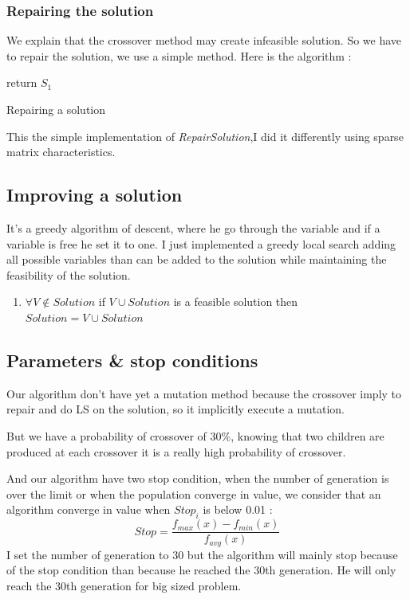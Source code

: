 \documentclass[12pt]{article}
\begin{document}
	\subsubsection{Repairing the solution}
	We explain that the crossover method may create infeasible solution. So we have to repair the solution, we use a simple method.
	Here is the algorithm :
	
	 \begin{algorithm}
	 	return	$S_1$
	 	\caption{Repairing a solution}
	 \end{algorithm}
 	This the simple implementation of \textit{RepairSolution},I did it differently using sparse matrix characteristics.
 	\subsection{Improving a solution}
 	It's a greedy algorithm of descent, where he go through the variable and if a variable  is free he set it to one.
 	I just implemented a greedy local search adding all possible variables than can be added to the solution while maintaining the feasibility of the solution.
 	\begin{enumerate}\item $\forall V \notin Solution$
 		\subitem if $ V  \cup Solution $ is a feasible solution
 		\subsubitem then $ Solution = V \cup Solution$ 
 	\end{enumerate}
 	\subsection{Parameters \& stop conditions}
 	Our algorithm don't have yet a mutation method because the crossover imply to repair and do LS on the solution, so it implicitly execute a mutation. 
 	
 	But we have a probability of crossover of 30\%, knowing that two children are produced at each crossover it is a really high probability of crossover.
 	
 	And our algorithm have two stop condition, when the number of generation is over the limit or when the population converge in value, we consider that an algorithm converge in value when $Stop_i$ is below 0.01 :
 	$$
 	Stop =  \frac{f_{max}(x) - f_{min}(x)}{f_{avg}(x)} 
 	$$
 	I set the number of generation to 30 but the algorithm will mainly stop because of the stop condition than because he reached the 30th generation. He will only reach the 30th generation for big sized problem.
 	\pagebreak
\end{document}
